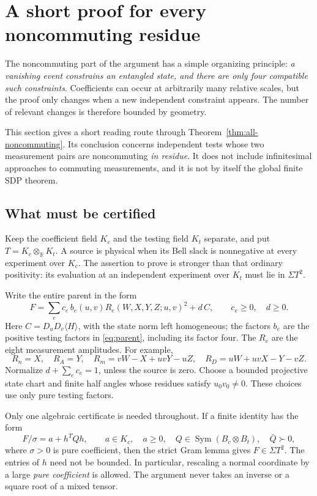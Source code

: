 \section{A short proof for every noncommuting residue}
\label{sec:penpaper-noncommuting}

The noncommuting part of the argument has a simple organizing principle:
\emph{a vanishing event constrains an entangled state, and there are only four
compatible such constraints}.  Coefficients can occur at arbitrarily many
relative scales, but the proof only changes when a new independent constraint
appears.  The number of relevant changes is therefore bounded by geometry.

This section gives a short reading route through
Theorem~\ref{thm:all-noncommuting}.  Its conclusion concerns independent tests
whose two measurement pairs are noncommuting \emph{in residue}.  It does not
include infinitesimal approaches to commuting measurements, and it is not by
itself the global finite SDP theorem.

\subsection{What must be certified}
Keep the coefficient field $K_c$ and the testing field $K_t$ separate, and put
$T=K_c\otimes_{\mathbb R}K_t$.  A source is physical when its Bell slack is
nonnegative at every experiment over $K_c$.  The assertion to prove is stronger
than that ordinary positivity: its evaluation at an independent experiment
over $K_t$ must lie in $\Sigma T^2$.

Write the entire parent in the form
\begin{equation}\label{eq:pp-packets}
 F=\sum_{e}c_e\,b_e(u,v)R_e(W,X,Y,Z;u,v)^2+d\,C,
 \qquad c_e\geq0,\quad d\geq0.
\end{equation}
Here $C=D_uD_v\langle H\rangle$, with the state norm left homogeneous;
the factors $b_e$ are the positive testing factors in
\eqref{eq:parent}, including its factor four.  The $R_e$ are the eight
measurement amplitudes.  For example,
\[
 R_n=X,\quad R_A=Y,\quad
 R_m=vW-X+uvY-uZ,\quad
 R_D=uW+uvX-Y-vZ.
\]
Normalize $d+\sum_e c_e=1$, unless the source is zero.  Choose a bounded
projective state chart and finite half angles whose residues satisfy
$u_0v_0\ne0$.  These choices use only pure testing factors.

Only one algebraic certificate is needed throughout.  If a finite identity
has the form
\begin{equation}\label{eq:pp-strict}
 F/\sigma=a+h^TQh,\qquad a\in K_c,\quad a\geq0,
 \quad Q\in\operatorname{Sym}(B_c\otimes B_t),\quad\bar Q\succ0,
\end{equation}
where $\sigma>0$ is pure coefficient, then the strict Gram lemma gives
$F\in\Sigma T^2$.  The entries of $h$ need not be bounded.  In particular,
rescaling a normal coordinate by a large \emph{pure coefficient} is allowed.
The argument never takes an inverse or a square root of a mixed tensor.

